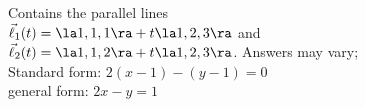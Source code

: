 {Contains the parallel lines\\
$\vec\ell_1(t) = \la 1,1,1\ra + t\la 1,2,3\ra$ and \\
$\vec\ell_2(t) = \la 1,1,2\ra + t\la 1,2,3\ra$.
}
{Answers may vary;\\
Standard form: $2(x-1)-(y-1)=0$\\
general form: $2x-y=1$
}

